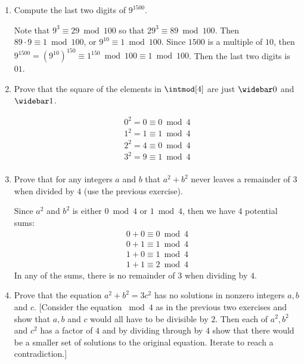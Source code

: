 \begin{enumerate}
\begin{sol}
\begin{align*}
            37^{32} & \equiv (-6)^2 \bmod 29 \equiv 7 \bmod 29 \\
            37^{64} & \equiv 20 \bmod 29
        \end{align*}
        Then we have
        $$37^{64}37^{32}37^4 \equiv 20 \cdot 7 \cdot 7 \bmod 29 \equiv 20^2 \bmod 29 \equiv 23 \bmod 29$$
        Hence the remainder when dividing $37^{100}$ by $29$ is $23$.
    \end{sol}
    \item Compute the last two digits of $9^{1500}$.
    \begin{sol}
        Note that $9^3 \equiv 29 \bmod 100$ so that $29^3 \equiv 89 \bmod 100$. Then $89 \cdot 9 \equiv 1 \bmod 100$, or $9^{10} \equiv 1 \bmod 100$. Since $1500$ is a multiple of $10$, then $9^{1500} = (9^{10})^{150} \equiv 1^{150} \bmod 100 \equiv 1 \bmod 100$. Then the last two digits is $01$.
    \end{sol}
    \item Prove that the square of the elements in $\intmod[4]$ are just $\widebar 0$ and $\widebar 1$.
    \begin{sol}
        \begin{align*}
            0^2 = 0 \equiv 0 \bmod 4 \\
            1^2 = 1 \equiv 1 \bmod 4 \\
            2^2 = 4 \equiv 0 \bmod 4 \\
            3^2 = 9 \equiv 1 \bmod 4 \\
        \end{align*}
    \end{sol}
    \item Prove that for any integers $a$ and $b$ that $a^2 + b^2$ never leaves a remainder of $3$ when divided by $4$ (use the previous exercise).
    \begin{sol}
        Since $a^2 $ and $b^2$ is either $0 \bmod 4$ or $1 \bmod 4$, then we have $4$ potential sums:
        \begin{align*}
            0 + 0 \equiv 0 \bmod 4 \\
            0 + 1 \equiv 1 \bmod 4 \\
            1 + 0 \equiv 1 \bmod 4 \\
            1 + 1 \equiv 2 \bmod 4
        \end{align*}
        In any of the sums, there is no remainder of $3$ when dividing by $4$.
    \end{sol}
    \item Prove that the equation $a^2 + b^2 = 3c^2$ has no solutions in nonzero integers $a, b$ and $c$. [Consider the equation $\bmod 4$ as in the previous two exercises and show that $a, b$ and $c$ would all have to be divisible by $2$. Then each of $a^2, b^2$ and $c^2$ has a factor of $4$ and by dividing through by $4$ show that there would be a smaller set of solutions to the original equation. Iterate to reach a contradiction.]

\end{enumerate}
